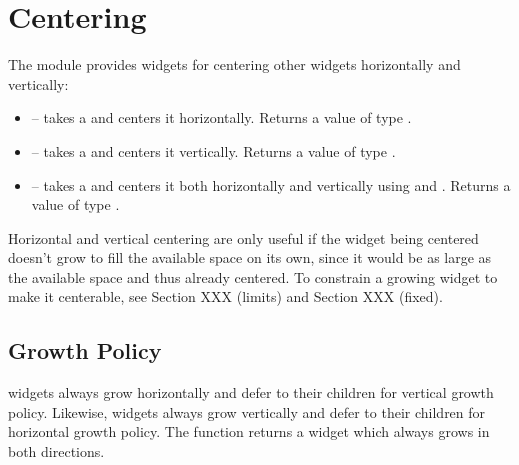 \section{Centering}

The  module provides widgets for centering other widgets
horizontally and vertically:

\begin{itemize}
\item {} -- takes a  and centers it
  horizontally.  Returns a value of type .
\item {} -- takes a  and centers it
  vertically.  Returns a value of type .
\item {} -- takes a  and centers it both
  horizontally and vertically using  and .
  Returns a value of type .
\end{itemize}

Horizontal and vertical centering are only useful if the widget being
centered doesn't grow to fill the available space on its own, since it
would be as large as the available space and thus already centered.
To constrain a growing widget to make it centerable, see Section XXX
(limits) and Section XXX (fixed).

\subsection{Growth Policy}

 widgets always grow horizontally and defer to their
children for vertical growth policy.  Likewise,  widgets
always grow vertically and defer to their children for horizontal
growth policy.  The  function returns a widget which
always grows in both directions.
